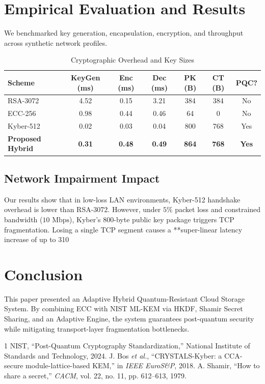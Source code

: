 \documentclass[journal,twoside]{IEEEtran}
\begin{document}
\section{Empirical Evaluation and Results}
We benchmarked key generation, encapsulation, encryption, and throughput across synthetic network profiles.

\begin{table}[htbp]
\caption{Cryptographic Overhead and Key Sizes}
\label{tab:benchmarks}
\centering
\begin{tabular}{lcccccc}
\toprule
\textbf{Scheme} & \textbf{KeyGen (ms)} & \textbf{Enc (ms)} & \textbf{Dec (ms)} & \textbf{PK (B)} & \textbf{CT (B)} & \textbf{PQC?} \\
\midrule
RSA-3072 & 4.52 & 0.15 & 3.21 & 384 & 384 & No \\
ECC-256 & 0.98 & 0.44 & 0.46 & 64 & 0 & No \\
Kyber-512 & 0.02 & 0.03 & 0.04 & 800 & 768 & Yes \\
\textbf{Proposed Hybrid} & \textbf{0.31} & \textbf{0.48} & \textbf{0.49} & \textbf{864} & \textbf{768} & \textbf{Yes} \\
\bottomrule
\end{tabular}
\end{table}

\subsection{Network Impairment Impact}
Our results show that in low-loss LAN environments, Kyber-512 handshake overhead is lower than RSA-3072. However, under $5\%$ packet loss and constrained bandwidth ($10\text{ Mbps}$), Kyber's 800-byte public key package triggers TCP fragmentation. Losing a single TCP segment causes a **super-linear latency increase of up to 310%

\section{Conclusion}
This paper presented an Adaptive Hybrid Quantum-Resistant Cloud Storage System. By combining ECC with NIST ML-KEM via HKDF, Shamir Secret Sharing, and an Adaptive Engine, the system guarantees post-quantum security while mitigating transport-layer fragmentation bottlenecks.

\begin{thebibliography}{1}
 NIST, ``Post-Quantum Cryptography Standardization,'' National Institute of Standards and Technology, 2024.
 J. Bos \textit{et al.}, ``CRYSTALS-Kyber: a CCA-secure module-lattice-based KEM,'' in \textit{IEEE EuroS\&P}, 2018.
 A. Shamir, ``How to share a secret,'' \textit{CACM}, vol. 22, no. 11, pp. 612--613, 1979.
\end{thebibliography}
\end{document}
